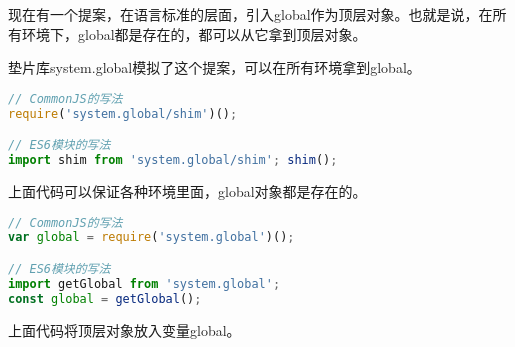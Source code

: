 现在有一个提案，在语言标准的层面，引入global作为顶层对象。也就是说，在所有环境下，global都是存在的，都可以从它拿到顶层对象。

垫片库system.global模拟了这个提案，可以在所有环境拿到global。

\begin{lstlisting}[language=JavaScript]
// CommonJS的写法
require('system.global/shim')();

// ES6模块的写法
import shim from 'system.global/shim'; shim();
\end{lstlisting}

上面代码可以保证各种环境里面，global对象都是存在的。



\begin{lstlisting}[language=JavaScript]
// CommonJS的写法
var global = require('system.global')();

// ES6模块的写法
import getGlobal from 'system.global';
const global = getGlobal();
\end{lstlisting}

上面代码将顶层对象放入变量global。

\begin{lstlisting}[language=JavaScript]

\end{lstlisting}



\begin{lstlisting}[language=JavaScript]

\end{lstlisting}



\begin{lstlisting}[language=JavaScript]

\end{lstlisting}



\begin{lstlisting}[language=JavaScript]

\end{lstlisting}



\begin{lstlisting}[language=JavaScript]

\end{lstlisting}



\begin{lstlisting}[language=JavaScript]

\end{lstlisting}

